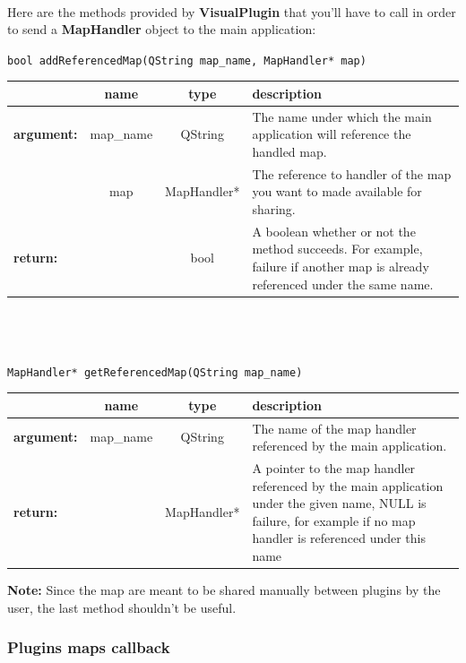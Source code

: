 \documentclass[a4paper]{scrreprt}
\begin{document}
	\paragraph{}
	Here are the methods provided by
	\textbf{VisualPlugin} that you'll have to call in order to send a
	\textbf{MapHandler} object to the main application:
	\begin{center}
		\texttt{bool addReferencedMap(QString map\_name, MapHandler* map)}
	\begin{tabular}{|l|c|c|p{}|}
		\hline
		~ & name & type & description
		\\ \hline
		\textbf{argument:} & map\_name & QString &
			The name under which the main application will reference the
			handled map.
		\\ \cline{2-4}
		~ & map & MapHandler* & 
			The reference to handler of the map you want to made available for sharing.
		\\ \hline
		\textbf{return:} & ~ & bool &
			A boolean whether or not the method succeeds. For example, failure if
			another map is already referenced under the same name.
		\\ \hline
	\end{tabular}
	\\~\\~\\
		\texttt{MapHandler*  getReferencedMap(QString map\_name)}
	\begin{tabular}{|l|c|c|p{}|}
		\hline
		~ & name & type & description
		\\ \hline
		\textbf{argument:} & map\_name & QString &
			The name of the map handler referenced by the main application.
		\\ \hline
		\textbf{return:} & ~ & MapHandler* & 
			A pointer to the map handler referenced by the main application under the
			given name, NULL is failure, for example if no map handler is referenced
			under this name
		\\ \hline
	\end{tabular}	
	\end{center}
	\textbf{Note: } Since the map are meant to be shared manually between plugins
	by the user, the last method shouldn't be useful.
	
	\subsubsection{Plugins maps callback}
\end{document}
